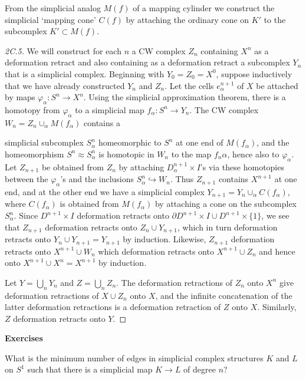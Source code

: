 From the simplicial analog $M(f)$ of a mapping cylinder we construct the simplicial `mapping cone' $C(f)$ by attaching the ordinary cone on $K'$ to the subcomplex $K' \subset M(f)$.
\begin{proof}[2C.5]
 We will construct for each $n$ a CW complex $Z_n$ containing $X^n$ as a deformation retract and also containing as a deformation retract a subcomplex $Y_n$ that is a simplicial complex. Beginning with $Y_0 = Z_0 = X^0$, suppose inductively that we have already constructed $Y_n$ and $Z_n$. Let the cells $e^{n+1}_\alpha$ of $X$ be attached by maps $\varphi_\alpha : S^n \to X^n$. Using the simplicial approximation theorem, there is a homotopy from $\varphi_\alpha$ to a simplicial map $f_\alpha : S^n \to Y_n$. The CW complex $W_n = Z_n \cup_\alpha M(f_\alpha)$ contains a

simplicial subcomplex $S_\alpha^n$ homeomorphic to $S^n$ at one end of $M(f_\alpha)$, and the homeomorphism $S^n \approx S_\alpha^n$ is homotopic in $W_n$ to the map $f_n\alpha$, hence also to $\varphi_\alpha$. Let $Z_{n+1}$ be obtained from $Z_n$ by attaching $D_\alpha^{n+1} \times I$'s via these homotopies between the $\varphi_\alpha$'s and the inclusions $S_\alpha^n \hookrightarrow W_n$. Thus $Z_{n+1}$ contains $X^{n+1}$ at one end, and at the other end we have a simplicial complex $Y_{n+1} = Y_n \cup_\alpha C(f_\alpha)$, where $C(f_\alpha)$ is obtained from $M(f_\alpha)$ by attaching a cone on the subcomplex $S_\alpha^n$. Since $D^{n+1} \times I$ deformation retracts onto $\partial D^{n+1} \times I \cup D^{n+1} \times \{1\}$, we see that $Z_{n+1}$ deformation retracts onto $Z_n \cup Y_{n+1}$, which in turn deformation retracts onto $Y_n \cup Y_{n+1} = Y_{n+1}$ by induction. Likewise, $Z_{n+1}$ deformation retracts onto $X^{n+1} \cup W_n$ which deformation retracts onto $X^{n+1} \cup Z_n$ and hence onto $X^{n+1} \cup X^n = X^{n+1}$ by induction.

Let $Y = \bigcup_n Y_n$ and $Z = \bigcup_n Z_n$. The deformation retractions of $Z_n$ onto $X^n$ give deformation retractions of $X \cup Z_n$ onto $X$, and the infinite concatenation of the latter deformation retractions is a deformation retraction of $Z$ onto $X$. Similarly, $Z$ deformation retracts onto $Y$.
\end{proof}
\textbf{Exercises}

\begin{exercise}
What is the minimum number of edges in simplicial complex structures $K$ and $L$ on $S^1$ such that there is a simplicial map $K \to L$ of degree $n$?
\end{exercise}

